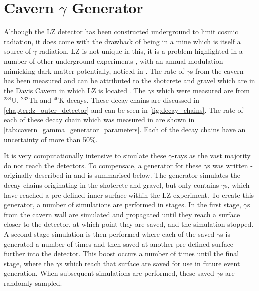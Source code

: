 \section{Cavern $\gamma$ Generator}
\label{sec:cavern_gamma_generator}

\par
Although the LZ detector has been constructed underground to limit cosmic radiation, it does come with the drawback of being in a mine which is itself a source of $\gamma$ radiation.
LZ is not unique in this, it is a problem highlighted in a number of other underground experiments \cite{cavern_gamma_annual_modulation_CoGeNT_ref, cavern_gammas_in_Soudan_mine_ref}, with an annual modulation mimicking dark matter potentially, noticed in \cite{cavern_gamma_annual_modulation_CoGeNT_ref}.
The rate of $\gamma$s from the cavern has been measured and can be attributed to the shotcrete and gravel which are in the Davis Cavern in which LZ is located \cite{LZ_Gamma_Ray_Background_ref}.
The $\gamma$s which were measured are from $^{238}$U, $^{232}$Th and $^{40}$K decays.
These decay chains are discussed in \autoref{chapter:lz_outer_detector} and can be seen in \autoref{fig:decay_chains}.
The rate of each of these decay chain which was measured in \cite{LZ_Gamma_Ray_Background_ref} are shown in \autoref{tab:cavern_gamma_generator_parameters}.
Each of the decay chains have an uncertainty of more than 50\%.
\par
It is very computationally intensive to simulate these $\gamma$-rays as the vast majority do not reach the detectors.
To compensate, a generator for these $\gamma$s was written - originally described in \cite{rg_generator_ref} and is summarised below.
The generator simulates the decay chains originating in the shotcrete and gravel, but only contains $\gamma$s, which have reached a pre-defined inner surface within the LZ experiment.
To create this generator, a number of simulations are performed in stages.
In the first stage, $\gamma$s from the cavern wall are simulated and propagated until they reach a surface closer to the detector, at which point they are saved, and the simulation stopped.
A second stage simulation is then performed where each of the saved $\gamma$s is generated a number of times and then saved at another pre-defined surface further into the detector.
This boost occurs a number of times until the final stage, where the $\gamma$s which reach that surface are saved for use in future event generation.
When subsequent simulations are performed, these saved $\gamma$s are randomly sampled. 

